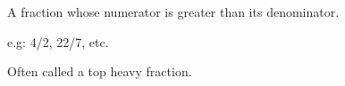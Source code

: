 A fraction whose numerator is greater than its denominator.  
\par
e.g:  4/2, 22/7, etc. \par
Often called a top heavy fraction.